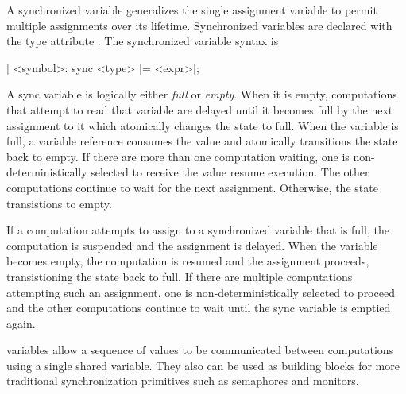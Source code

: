 A synchronized variable generalizes the single assignment variable to
permit multiple assignments over its lifetime. Synchronized variables
are declared with the type attribute . The synchronized
variable syntax is
\begin{chapel}
[[var]] <symbol>: sync <type> [= <expr>];
\end{chapel}
A sync variable is logically either {\em full} or {\em empty}. When it
is empty, computations that attempt to read that variable are delayed
until it becomes full by the next assignment to it which atomically
changes the state to full. When the variable is full, a variable
reference consumes the value and atomically transitions the state back
to empty. If there are more than one computation waiting, one is
non-deterministically selected to receive the value resume execution.
The other computations continue to wait for the next
assignment. Otherwise, the state transistions to empty. 

If a computation attempts to assign to a synchronized variable that is
full, the computation is suspended and the assignment is delayed. When
the variable becomes empty, the computation is resumed and the
assignment proceeds, transistioning the state back to full. If there
are multiple computations attempting such an assignment, one is
non-deterministically selected to proceed and the other computations
continue to wait until the sync variable is emptied again.

 variables allow a sequence of values to be communicated
between computations using a single shared variable. They also can be
used as building blocks for more traditional synchronization
primitives such as semaphores and monitors.
